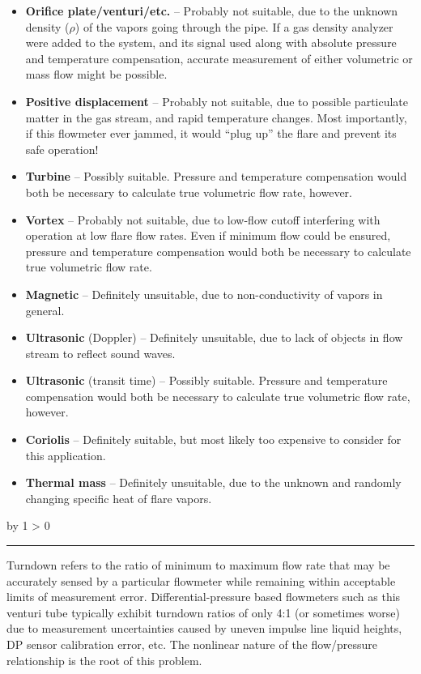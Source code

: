 \documentclass[12pt,a4paper]{article}
\def\svar{
           \advance\answnum by 1
           \ifnum \answnum > 0
                \hrule
                \vskip 3pt
                \leftline{Svar \the\answnum}
                \vskip 3pt \fi}
\begin{document}
\begin{itemize}
\item{} {\bf Orifice plate/venturi/etc.} -- Probably not suitable, due to the unknown density ($\rho$) of the vapors going through the pipe.  If a gas density analyzer were added to the system, and its signal used along with absolute pressure and temperature compensation, accurate measurement of either volumetric or mass flow might be possible.
\vskip 10pt
\item{} {\bf Positive displacement} -- Probably not suitable, due to possible particulate matter in the gas stream, and rapid temperature changes.  Most importantly, if this flowmeter ever jammed, it would ``plug up'' the flare and prevent its safe operation!
\vskip 10pt
\item{} {\bf Turbine} -- Possibly suitable.  Pressure and temperature compensation would both be necessary to calculate true volumetric flow rate, however.
\vskip 10pt
\item{} {\bf Vortex} -- Probably not suitable, due to low-flow cutoff interfering with operation at low flare flow rates.  Even if minimum flow could be ensured, pressure and temperature compensation would both be necessary to calculate true volumetric flow rate.
\vskip 10pt
\item{} {\bf Magnetic} -- Definitely unsuitable, due to non-conductivity of vapors in general.
\vskip 10pt
\item{} {\bf Ultrasonic} (Doppler) -- Definitely unsuitable, due to lack of objects in flow stream to reflect sound waves. 
\vskip 10pt
\item{} {\bf Ultrasonic} (transit time) -- Possibly suitable.  Pressure and temperature compensation would both be necessary to calculate true volumetric flow rate, however.
\vskip 10pt
\item{} {\bf Coriolis} -- Definitely suitable, but most likely too expensive to consider for this application.
\vskip 10pt
\item{} {\bf Thermal mass} -- Definitely unsuitable, due to the unknown and randomly changing specific heat of flare vapors.
\end{itemize}

 
\vskip 10pt \filbreak 
\svar{} 

Turndown refers to the ratio of minimum to maximum flow rate that may be accurately sensed by a particular flowmeter while remaining within acceptable limits of measurement error.  Differential-pressure based flowmeters such as this venturi tube typically exhibit turndown ratios of only 4:1 (or sometimes worse) due to measurement uncertainties caused by uneven impulse line liquid heights, DP sensor calibration error, etc.  The nonlinear nature of the flow/pressure relationship is the root of this problem.
\end{document}
